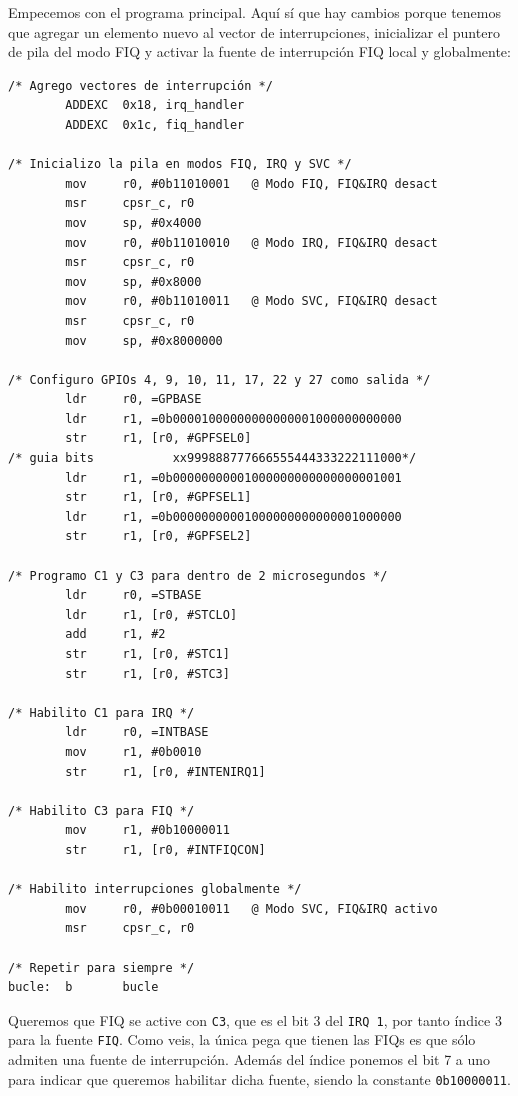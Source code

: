 Empecemos con el programa principal. Aquí sí que hay cambios porque tenemos que agregar un
elemento nuevo al vector de interrupciones, inicializar el puntero de pila del modo FIQ y activar
la fuente de interrupción FIQ local y globalmente:

\begin{lstlisting}[caption={Programa principal de inter5.s},label={lst:codigoPract5_5}]
/* Agrego vectores de interrupción */
        ADDEXC  0x18, irq_handler
        ADDEXC  0x1c, fiq_handler

/* Inicializo la pila en modos FIQ, IRQ y SVC */
        mov     r0, #0b11010001   @ Modo FIQ, FIQ&IRQ desact
        msr     cpsr_c, r0
        mov     sp, #0x4000
        mov     r0, #0b11010010   @ Modo IRQ, FIQ&IRQ desact
        msr     cpsr_c, r0
        mov     sp, #0x8000
        mov     r0, #0b11010011   @ Modo SVC, FIQ&IRQ desact
        msr     cpsr_c, r0
        mov     sp, #0x8000000

/* Configuro GPIOs 4, 9, 10, 11, 17, 22 y 27 como salida */
        ldr     r0, =GPBASE
        ldr     r1, =0b00001000000000000001000000000000
        str     r1, [r0, #GPFSEL0]
/* guia bits           xx999888777666555444333222111000*/
        ldr     r1, =0b00000000001000000000000000001001
        str     r1, [r0, #GPFSEL1]
        ldr     r1, =0b00000000001000000000000001000000
        str     r1, [r0, #GPFSEL2]

/* Programo C1 y C3 para dentro de 2 microsegundos */
        ldr     r0, =STBASE
        ldr     r1, [r0, #STCLO]
        add     r1, #2
        str     r1, [r0, #STC1]
        str     r1, [r0, #STC3]

/* Habilito C1 para IRQ */
        ldr     r0, =INTBASE
        mov     r1, #0b0010
        str     r1, [r0, #INTENIRQ1]

/* Habilito C3 para FIQ */
        mov     r1, #0b10000011
        str     r1, [r0, #INTFIQCON]

/* Habilito interrupciones globalmente */
        mov     r0, #0b00010011   @ Modo SVC, FIQ&IRQ activo
        msr     cpsr_c, r0

/* Repetir para siempre */
bucle:  b       bucle
\end{lstlisting}

Queremos que FIQ se active con {\tt C3}, que es el bit 3 del {\tt IRQ 1}, por tanto
índice 3 para la fuente {\tt FIQ}. Como veis, la única pega que tienen las FIQs es que
sólo admiten una fuente de interrupción. Además del índice ponemos el bit 7 a uno para
indicar que queremos habilitar dicha fuente, siendo la constante {\tt 0b10000011}.

